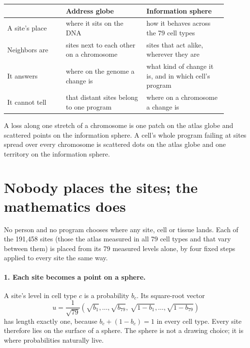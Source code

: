 \begin{center}
\begin{tabular}{p{0.24\linewidth}p{0.33\linewidth}p{0.33\linewidth}}
 & \textbf{Address globe} & \textbf{Information sphere}\\\hline
A site's place & where it sits on the DNA & how it behaves across the 79 cell types\\
Neighbors are & sites next to each other on a chromosome & sites that act alike, wherever they are\\
It answers & where on the genome a change is & what kind of change it is, and in which cell's program\\
It cannot tell & that distant sites belong to one program & where on a chromosome a change is\\
\end{tabular}
\end{center}

A loss along one stretch of a chromosome is one patch on the atlas globe and scattered points on the information sphere. A cell's
whole program failing at sites spread over every chromosome is scattered dots on the atlas globe and one territory on the information
sphere.

\section{Nobody places the sites; the mathematics does}

No person and no program chooses where any site, cell or tissue lands. Each of the 191{,}458 sites (those the atlas measured in all 79
cell types and that vary between them) is placed from its 79 measured levels alone, by four fixed steps applied to every site the same way.

\paragraph{1. Each site becomes a point on a sphere.} A site's level in cell type $c$ is a probability $b_c$. Its square-root vector
\begin{equation}
u = \frac{1}{\sqrt{79}}\left(\sqrt{b_1},\dots,\sqrt{b_{79}},\ \sqrt{1-b_1},\dots,\sqrt{1-b_{79}}\right)
\end{equation}
has length exactly one, because $b_c + (1-b_c) = 1$ in every cell type. Every site therefore lies on the surface of a sphere. The sphere
is not a drawing choice; it is where probabilities naturally live.

